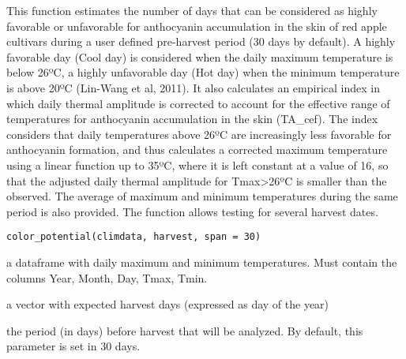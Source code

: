 \documentclass[a4paper]{book}
\begin{document}
%
\begin{Examples}
\end{Examples}
%
\begin{Description}\relax
This function estimates the number of days that can be 
considered as highly favorable or unfavorable for anthocyanin 
accumulation in the skin of red apple cultivars during a
user defined pre-harvest period (30 days  by default). 
A highly favorable day (Cool day) is considered when the daily 
maximum temperature is below 26ºC, a highly unfavorable day (Hot day)
when the minimum temperature is above 20ºC (Lin-Wang et al, 2011). It
also calculates an empirical index in which daily thermal amplitude 
is corrected to account for the effective range of temperatures for
anthocyanin accumulation in the skin (TA\_cef). The index considers that
daily temperatures above 26ºC are increasingly less favorable for 
anthocyanin formation, and thus calculates a corrected maximum 
temperature using a linear function up to 35ºC, where it is left 
constant at a value of 16, so that the adjusted daily thermal amplitude 
for Tmax>26ºC is smaller than the observed. 
The average of maximum and minimum temperatures during the same 
period is also provided. The function allows testing for several 
harvest dates.
\end{Description}
%
\begin{Usage}
\begin{verbatim}
color_potential(climdata, harvest, span = 30)
\end{verbatim}
\end{Usage}
%
\begin{Arguments}
\begin{ldescription}
\item[\code{climdata}] a dataframe with daily maximum and minimum temperatures.
Must contain the columns Year, Month, Day, Tmax, Tmin.

\item[\code{harvest}] a vector with expected harvest days
(expressed as day of the year)

\item[\code{span}] the period (in days) before harvest that will be analyzed. By 
default, this parameter is set in 30 days.
\end{ldescription}
\end{Arguments}
\end{document}
